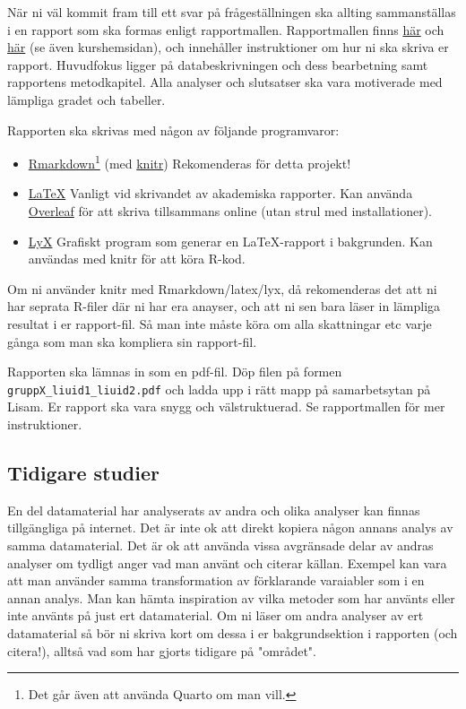 \documentclass[a4paper]{article}
\begin{document}
När ni väl kommit fram till ett svar på frågeställningen ska allting sammanställas i en rapport som ska formas enligt rapportmallen. Rapportmallen finns \href{https://raw.githubusercontent.com/STIMALiU/732G57_ML/master/project/template/Rapportmall STIMA projekt.rmd}{här} och \href{https://raw.githubusercontent.com/STIMALiU/732G57_ML/master/project/template/Rapportmall-STIMA-projekt.pdf}{här} (se även kurshemsidan), och innehåller instruktioner om hur ni ska skriva er rapport. Huvudfokus ligger på databeskrivningen och dess bearbetning samt rapportens metodkapitel. Alla analyser och slutsatser ska vara motiverade med lämpliga gradet och tabeller.

Rapporten ska skrivas med någon av följande programvaror:
\begin{itemize}
    \item \href{https://rmarkdown.rstudio.com/}{Rmarkdown}\footnote{Det går även att använda Quarto om man vill.} (med \href{https://yihui.org/knitr/}{knitr}) Rekomenderas för detta projekt!
    \item \href{https://en.wikipedia.org/wiki/LaTeX}{LaTeX} Vanligt vid skrivandet av akademiska rapporter. Kan använda \href{https://www.overleaf.com}{Overleaf} för att skriva tillsammans online (utan strul med installationer).
    \item \href{https://www.lyx.org/}{LyX} Grafiskt program som generar en LaTeX-rapport i bakgrunden. Kan användas med knitr för att köra R-kod.
\end{itemize}
Om ni använder knitr med Rmarkdown/latex/lyx, då rekomenderas det att ni har seprata R-filer där ni har era anayser, och att ni sen bara läser in lämpliga resultat i er rapport-fil. Så man inte måste köra om alla skattningar etc varje gånga som man ska kompliera sin rapport-fil. 

Rapporten ska lämnas in som en pdf-fil.  Döp filen på formen \texttt{gruppX\_liuid1\_liuid2.pdf} och ladda upp i rätt mapp på samarbetsytan på Lisam. Er rapport ska vara snygg och välstruktuerad. Se rapportmallen för mer instruktioner.


\subsection*{Tidigare studier}
En del datamaterial har analyserats av andra och olika analyser kan finnas tillgängliga på internet. Det är inte ok att direkt kopiera någon annans analys av samma datamaterial. Det är ok att använda vissa avgränsade delar av andras analyser om tydligt anger vad man använt och citerar källan. Exempel kan vara att man använder samma transformation av förklarande varaiabler som i en annan analys. Man kan hämta inspiration av vilka metoder som har använts eller inte använts på just ert datamaterial. Om ni läser om andra analyser av ert datamaterial så bör ni skriva kort om dessa i er bakgrundsektion i rapporten (och citera!), alltså vad som har gjorts tidigare på "området". 
\end{document}
